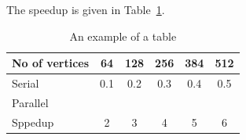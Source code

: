 	The speedup is given in Table~\ref{tab:example}.
	\begin{table}[!htb]
		\centering
		\caption{An example of a table}\label{tab:example}
		\begin{tabular}{l|ccccc}
			\toprule
			No of vertices & 64 & 128 & 256 & 384 & 512\\
			\midrule
			Serial &0.1&0.2&0.3&0.4&0.5\\
			Parallel &&&&\\
			Sppedup &2&3&4&5&6\\
			\bottomrule
		\end{tabular}
	\end{table} 
	
	\newpage
	
	
 

